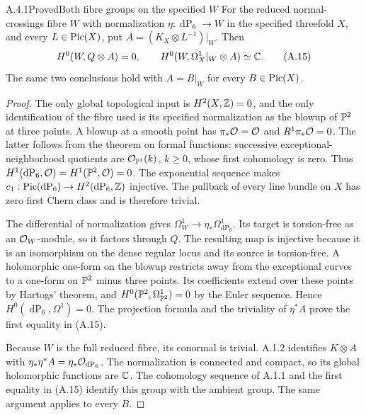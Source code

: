 \begin{statement}{A.4.1}{Proved}{Both fibre groups on the specified $W$}
For the reduced normal-crossings fibre $W$ with normalization $\eta:\operatorname{dP}_6\to W$ in the specified threefold $X$, and every $L\in\operatorname{Pic}(X)$, put $A=(K_X\otimes L^{-1})|_W$. Then
\[
H^0(W,Q\otimes A)=0,
\qquad H^0(W,\Omega_X^1|_W\otimes A)\simeq\mathbb C.
\tag{A.15}
\]
The same two conclusions hold with $A=B|_W$ for every $B\in\operatorname{Pic}(X)$.
\end{statement}
\begin{proof}
The only global topological input is $H^2(X,\mathbb Z)=0$, and the only identification of the fibre used is its specified normalization as the blowup of $\mathbb P^2$ at three points. A blowup at a smooth point has $\pi_*\mathcal O=\mathcal O$ and $R^1\pi_*\mathcal O=0$. The latter follows from the theorem on formal functions: successive exceptional-neighborhood quotients are $\mathcal O_{\mathbb P^1}(k)$, $k\ge0$, whose first cohomology is zero. Thus $H^1(\operatorname{dP}_6,\mathcal O)=H^1(\mathbb P^2,\mathcal O)=0$. The exponential sequence makes $c_1:\operatorname{Pic}(\operatorname{dP}_6)\to H^2(\operatorname{dP}_6,\mathbb Z)$ injective. The pullback of every line bundle on $X$ has zero first Chern class and is therefore trivial.

The differential of normalization gives $\Omega_W^1\to\eta_*\Omega^1_{\operatorname{dP}_6}$. Its target is torsion-free as an $\mathcal O_W$-module, so it factors through $Q$. The resulting map is injective because it is an isomorphism on the dense regular locus and its source is torsion-free. A holomorphic one-form on the blowup restricts away from the exceptional curves to a one-form on $\mathbb P^2$ minus three points. Its coefficients extend over these points by Hartogs' theorem, and $H^0(\mathbb P^2,\Omega^1_{\mathbb P^2})=0$ by the Euler sequence. Hence $H^0(\operatorname{dP}_6,\Omega^1)=0$. The projection formula and the triviality of $\eta^*A$ prove the first equality in (A.15).

Because $W$ is the full reduced fibre, its conormal is trivial. A.1.2 identifies $K\otimes A$ with $\eta_*\eta^*A=\eta_*\mathcal O_{\operatorname{dP}_6}$. The normalization is connected and compact, so its global holomorphic functions are $\mathbb C$. The cohomology sequence of A.1.1 and the first equality in (A.15) identify this group with the ambient group. The same argument applies to every $B$.
\end{proof}



